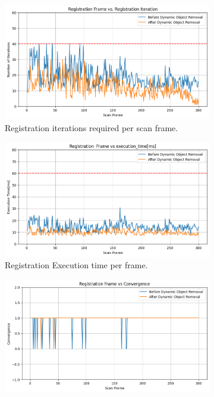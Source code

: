 \begin{figure}[H]
	\centering
	\begin{subfigure}[t]{0.45\textwidth}
		\includegraphics[width=\linewidth]{images/registration_iter_com.png}
		\caption{Registration iterations required per scan frame.}
		\label{fig:reg_iter}
	\end{subfigure}
	\hfill
	\begin{subfigure}[t]{0.45\textwidth}
		\includegraphics[width=\linewidth]{images/registration_exectime_com.png}
		\caption{Registration Execution time per frame.}
		\label{fig:reg_time}
	\end{subfigure}
	\hfill
	\begin{subfigure}[t]{0.45\textwidth}
		\includegraphics[width=\linewidth]{images/registration_conver_comp.png}

\end{subfigure}
\end{figure}
